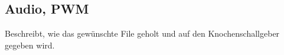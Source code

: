 \subsection{Audio, PWM}\label{sec:audioPWM}

Beschreibt, wie das gewünschte File geholt und auf den Knochenschallgeber gegeben wird.